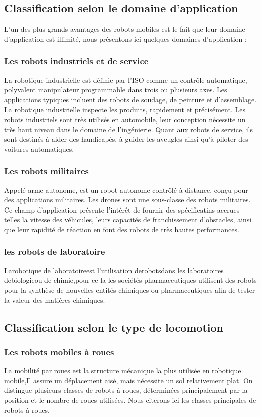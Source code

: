 \subsection{Classification selon le domaine d'application}
L’un des plus grands avantages des robots mobiles est le fait que leur domaine d’application est illimité, nous présentons ici quelques domaines d’application :

\subsubsection{Les robots industriels et de service}
La robotique industrielle est  définie par l'ISO comme un contrôle automatique, polyvalent manipulateur programmable dans trois ou plusieurs axes.
Les applications typiques incluent des robots de soudage, de peinture et d'assemblage. La robotique industrielle inspecte les produits, rapidement et précisément.
Les robots industriels sont très utilisés en automobile, leur conception nécessite  un très haut niveau dans le domaine de l'ingénierie.
Quant aux robots de service, ils sont destinés à aider des handicapés, à guider les aveugles ainsi qu’à piloter des voitures automatiques.
\subsubsection{Les robots militaires}
Appelé arme autonome, est un robot autonome contrôlé à distance, conçu pour des applications militaires. Les drones sont une sous-classe des robots militaires.
Ce champ d’application présente l’intérêt de fournir des spécificatins accrues telles la vitesse des véhicules, leurs capacités de franchissement d’obstacles, ainsi que leur rapidité de réaction en font des robots de très hautes performances.
\subsubsection{les robots de laboratoire}
Larobotique de laboratoireest l'utilisation derobotsdans les laboratoires debiologieou de chimie,pour ce la les sociétés pharmaceutiques utilisent des robots pour la synthèse de nouvelles entités chimiques ou pharmaceutiques afin de tester la valeur des matières chimiques.


\subsection{Classification selon le type de locomotion}
\subsubsection{Les robots mobiles à roues}
La mobilité par roues est la structure mécanique la plus utilisée en robotique mobile,Il assure un déplacement aisé, mais nécessite un sol relativement plat. On distingue plusieurs classes de robots à roues, déterminées principalement par la position et le nombre de roues utilisées. Nous citerons ici les classes principales de robots à roues.
